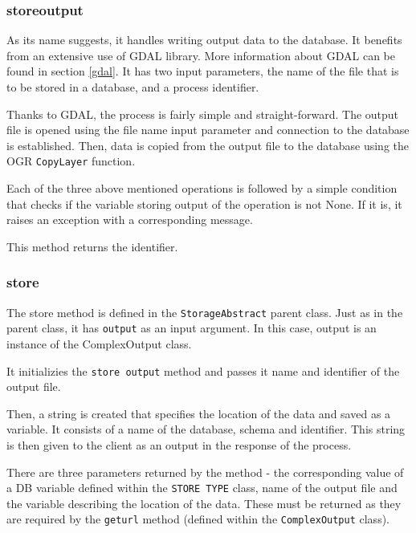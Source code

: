 \subsubsection{\textunderscore store\textunderscore output}

As its name suggests, it handles writing output data to the
database. It benefits from an extensive use of GDAL library. More
information about GDAL can be found in section \ref{gdal}. It has
two input parameters, the name of the file that is to be stored in a
database, and a process identifier.

Thanks to GDAL, the process is fairly simple and straight-forward. The
output file is opened using the file name input parameter and
connection to the database is established. Then, data is copied from
the output file to the database using the OGR \texttt{CopyLayer}
function.

Each of the three above mentioned operations is followed by a simple
condition that checks if the variable storing output of the operation
is not None. If it is, it raises an exception with a corresponding
message.

This method returns the identifier.


\subsubsection{store} 

The store method is defined in the \texttt{StorageAbstract} parent
class. Just as in the parent class, it has \texttt{output} as an input
argument. In this case, output is an instance of the ComplexOutput class.

It initializies the \texttt{\textunderscore store\textunderscore
  output} method and passes it name and identifier of the output file.

Then, a string is created that specifies the location of the data and
saved as a variable. It consists of a name of the database, schema and
identifier. This string is then given to the client as an output in
the  response of the process.

There are three parameters returned by the method - the corresponding
value of a DB variable defined within the \texttt{STORE\textunderscore
  TYPE} class, name of the output file and the variable describing the
location of the data. These must be returned as they are required by
the \texttt{get\textunderscore url} method (defined within the
\texttt{ComplexOutput} class).



